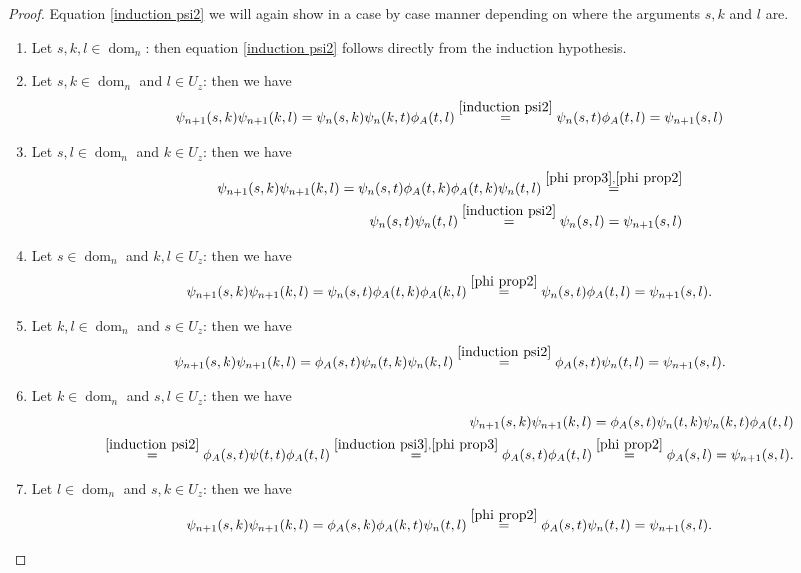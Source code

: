 \documentclass[b5paper,draft,openbib,12pt]{memoir}
\DeclareMathOperator{\dom}{dom}
\begin{document}
\begin{proof}
Equation \eqref{induction psi2} we will again show in a case by case manner depending on where the arguments \(s,k\) and \(l\) are.
\begin{enumerate}
\item Let \(s,k,l\in \dom_{n}\): then equation  \eqref{induction psi2} follows directly from the induction hypothesis.
\item Let \(s,k\in \dom_{n}\) and \(l\in U_z\): then we have
\begin{equation*}
\psi_{n+1}(s,k)\psi_{n+1}(k,l)=\psi_n(s,k)\psi_n(k,t)\phi_A(t,l)\overset{\eqref{induction psi2}}{=} \psi_n(s,t)\phi_A(t,l)=\psi_{n+1}(s,l)
\end{equation*}
\item Let \(s,l\in \dom_n\) and  \(k\in U_z\): then we have
\begin{align*}
\psi_{n+1}(s,k)\psi_{n+1}(k,l)=\psi_{n}(s,t)\phi_A(t,k)\phi_A(t,k)\psi_n(t,l)\overset{\eqref{phi prop3},\eqref{phi prop2}}{=}\\
\psi_{n}(s,t)\psi_n(t,l)\overset{\eqref{induction psi2}}{=}\psi_n(s,l)=\psi_{n+1}(s,l)
\end{align*}
\item Let \(s\in \dom_n\) and  \(k,l\in U_z\): then we have
\begin{align*}
\psi_{n+1}(s,k)\psi_{n+1}(k,l)=\psi_n(s,t)\phi_A(t,k)\phi_A(k,l)\overset{\eqref{phi prop2}}{=}\psi_n(s,t)\phi_A(t,l)
=\psi_{n+1}(s,l).
\end{align*}
\item Let \(k,l\in \dom_n\) and  \(s\in U_z\): then we have
\begin{align*}
\psi_{n+1}(s,k)\psi_{n+1}(k,l)=\phi_A(s,t)\psi_n(t,k)\psi_n(k,l)\overset{\eqref{induction psi2}}{=}\phi_A(s,t)\psi_n(t,l)=\psi_{n+1}(s,l).
\end{align*}
\item Let \(k\in \dom_n\) and  \(s,l\in U_z\): then we have
\begin{align*}
\psi_{n+1}(s,k)\psi_{n+1}(k,l)=\phi_A(s,t)\psi_n(t,k)\psi_n(k,t)\phi_A(t,l)\\
\overset{\eqref{induction psi2}}{=}\phi_A(s,t)\psi(t,t)\phi_A(t,l)
\overset{\eqref{induction psi3},\eqref{phi prop3}}{=}\phi_A(s,t)\phi_A(t,l)\overset{\eqref{phi prop2}}{=} \phi_A(s,l)=\psi_{n+1}(s,l).
\end{align*}
\item Let \(l\in \dom_n\) and  \(s,k\in U_z\): then we have
\begin{align*}
\psi_{n+1}(s,k)\psi_{n+1}(k,l)=\phi_A(s,k)\phi_A(k,t)\psi_n(t,l)\overset{\eqref{phi prop2}}{=}\phi_A(s,t)\psi_n(t,l)=\psi_{n+1}(s,l).

\end{align*}
\end{enumerate}
\end{proof}
\end{document}
